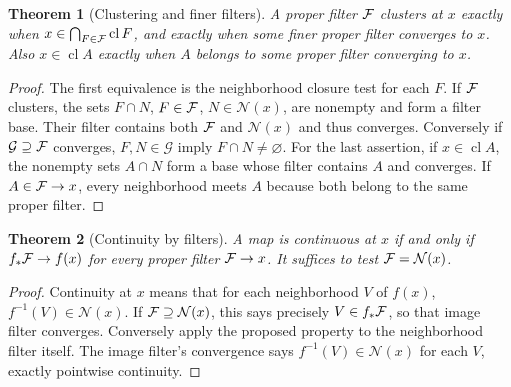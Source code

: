 \documentclass[11pt,oneside,openany]{book}
\newtheorem{theorem}{Theorem}[chapter]
\theoremstyle{definition}
\theoremstyle{remark}
\DeclareMathOperator{\cl}{cl}
\begin{document}
\begin{theorem}[Clustering and finer filters]\label{d10:04:filter-cluster}
A proper filter $\mathcal F$ clusters at $x$ exactly when $x\in\bigcap_{F\in\FF}\cl F$, and exactly when some finer proper filter converges to $x$. Also $x\in\cl A$ exactly when $A$ belongs to some proper filter converging to $x$.
\end{theorem}
\begin{proof}
The first equivalence is the neighborhood closure test for each $F$. If $\mathcal F$ clusters, the sets $F\cap N$, $F\in\mathcal F$, $N\in\mathcal N(x)$, are nonempty and form a filter base. Their filter contains both $\mathcal F$ and $\mathcal N(x)$ and thus converges. Conversely if $\mathcal G\supseteq\mathcal F$ converges, $F,N\in\mathcal G$ imply $F\cap N\ne\varnothing$. For the last assertion, if $x\in\cl A$, the nonempty sets $A\cap N$ form a base whose filter contains $A$ and converges. If $A\in\mathcal F\to x$, every neighborhood meets $A$ because both belong to the same proper filter.
\end{proof}

\begin{theorem}[Continuity by filters]\label{d10:04:continuity-filter}
A map is continuous at $x$ if and only if $f_*\mathcal F\to f(x)$ for every proper filter $\mathcal F\to x$. It suffices to test $\mathcal F=\mathcal N(x)$.
\end{theorem}
\begin{proof}
Continuity at $x$ means that for each neighborhood $V$ of $f(x)$, $f^{-1}(V)\in\mathcal N(x)$. If $\mathcal F\supseteq\mathcal N(x)$, this says precisely $V\in f_*\mathcal F$, so that image filter converges. Conversely apply the proposed property to the neighborhood filter itself. The image filter's convergence says $f^{-1}(V)\in\mathcal N(x)$ for each $V$, exactly pointwise continuity.
\end{proof}
\end{document}

